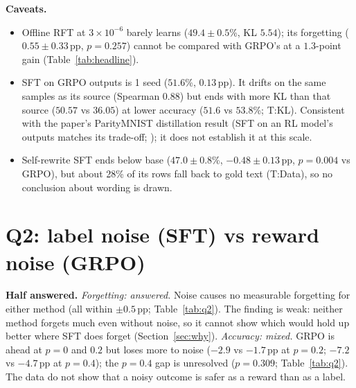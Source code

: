 \documentclass[11pt]{article}
\newcommand{\pp}{\,pp\xspace}
\newcommand{\T}[1]{\textsf{T:#1}}
\begin{document}
\textbf{Caveats.}
\begin{itemize}
\item Offline RFT at $3\times10^{-6}$ barely learns ($49.4 \pm 0.5$\%, KL $5.54$); its forgetting ($0.55 \pm 0.33$\pp,
  $p = 0.257$) cannot be compared with GRPO's at a $1.3$-point gain (Table~\ref{tab:headline}).
\item SFT on GRPO outputs is 1 seed ($51.6$\%, $0.13$\pp). It drifts on the same samples as its source (Spearman
  $0.88$) but ends with more KL than that source ($50.57$ vs $36.05$) at lower accuracy ($51.6$ vs $53.8$\%; \T{KL}).
  Consistent with the paper's ParityMNIST distillation result (SFT on an RL model's outputs matches its
  trade-off; \cite[\S4, p.~6; Fig.~9, p.~22]{razor}); it does not establish it at this scale.
\item Self-rewrite SFT ends below base ($47.0 \pm 0.8$\%, $-0.48 \pm 0.13$\pp, $p = 0.004$ vs GRPO), but about 28\%
  of its rows fall back to gold text (\T{Data}), so no conclusion about wording is drawn.
\end{itemize}

\section{Q2: label noise (SFT) vs reward noise (GRPO)}
\label{sec:q2}
\textbf{Half answered.} \emph{Forgetting: answered.} Noise causes no measurable forgetting for either method (all
within $\pm 0.5$\pp; Table~\ref{tab:q2}). The finding is weak: neither method forgets much even without noise, so it
cannot show which would hold up better where SFT does forget (Section~\ref{sec:why}). \emph{Accuracy: mixed.} GRPO is
ahead at $p = 0$ and $0.2$ but loses more to noise ($-2.9$ vs $-1.7$\pp at $p = 0.2$; $-7.2$ vs $-4.7$\pp at
$p = 0.4$); the $p = 0.4$ gap is unresolved ($p = 0.309$; Table~\ref{tab:q2}). The data do not show that a noisy
outcome is safer as a reward than as a label.
\end{document}
